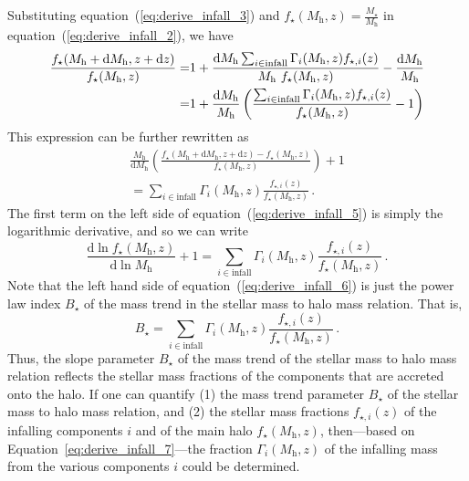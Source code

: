 \documentclass[useAMS,usenatbib,iop,numberedappendix]{mn2e}
\newcommand{\redshift}{\ensuremath{z}}
\newcommand{\dif}{\ensuremath{\mathrm{d}}}
\newcommand{\Mstar}{\ensuremath{M_{\star}}}
\newcommand{\Mhalo}{\ensuremath{M_{\mathrm{h}}}}
\newcommand{\Bstar}{\ensuremath{B_{\star}}}
\newcommand{\fstar}{\ensuremath{f_{\star}}}
\begin{document}
%
Substituting equation~(\ref{eq:derive_infall_3}) and $\fstar(\Mhalo, \redshift) = \frac{\Mstar}{ \Mhalo }$ in equation~(\ref{eq:derive_infall_2}), we have 
%
\begin{eqnarray}
\label{eq:derive_infall_4}
{\fstar(\Mhalo + \dif \Mhalo, \redshift + \dif\redshift) \over \fstar(\Mhalo, \redshift)}
=& 1+
\frac{ \dif\Mhalo \sum_{i \in \mathrm{infall}}\Gamma_{i}(\Mhalo, \redshift)  f_{\mathrm{\star},i}(\redshift) }
{\Mhalo~\fstar(\Mhalo, \redshift)} -\frac{\dif \Mhalo}{\Mhalo}
 \nonumber \\
=&1+\frac{\dif \Mhalo}{\Mhalo}
\left(\frac{ \sum_{i \in \mathrm{infall}} \Gamma_{i}(\Mhalo, \redshift)  f_{\mathrm{\star},i}(\redshift) }{\fstar(\Mhalo, \redshift) } 
-1\right) 
\end{eqnarray}
%
This expression can be further rewritten as
%
\begin{eqnarray}
\label{eq:derive_infall_5}
\frac{\Mhalo}{\dif \Mhalo}
\left(
\frac{
\fstar(\Mhalo + \dif \Mhalo, \redshift + \dif\redshift)  - 
\fstar(\Mhalo, \redshift)
}{
\fstar(\Mhalo, \redshift)
}
\right) + 1\nonumber \\ 
= 
\sum_{i \in \mathrm{infall}} 
\Gamma_{i}(\Mhalo, \redshift)  
\frac{ f_{\mathrm{\star},i}(\redshift) }{  
\fstar(\Mhalo, \redshift) }
\, .
\end{eqnarray}
%
The first term on the left side of equation~(\ref{eq:derive_infall_5}) is simply the logarithmic derivative, and so we can write
%
\begin{equation}
\label{eq:derive_infall_6}
\frac{
\dif \ln \fstar(\Mhalo, \redshift)
}{
\dif \ln \Mhalo
} + 1 = 
\sum_{i \in \mathrm{infall}} 
\Gamma_{i}(\Mhalo, \redshift)  
\frac{ f_{\mathrm{\star},i}(\redshift) }{  
\fstar(\Mhalo, \redshift) }
\, .
\end{equation}
%
Note that the left hand side of equation~(\ref{eq:derive_infall_6}) is just the power law index $\Bstar$ of the mass trend in the stellar mass to halo mass relation.  That is, 
%
\begin{equation}
\label{eq:derive_infall_7}
\Bstar = 
\sum_{i \in \mathrm{infall}} 
\Gamma_{i}(\Mhalo, \redshift)  
\frac{ f_{\mathrm{\star},i}(\redshift) }{  
\fstar(\Mhalo, \redshift) }
\, .
\end{equation}
%
Thus, the slope parameter $\Bstar$ of the mass trend of the stellar mass to halo mass relation reflects the stellar mass fractions of the components that are accreted onto the halo.
If one can quantify 
(1) the mass trend parameter $\Bstar$ of the stellar mass to halo mass relation, and 
(2) the stellar mass fractions $f_{\mathrm{\star},i}(\redshift)$ of the infalling components $i$ and of the main halo $\fstar(\Mhalo, \redshift)$,
then---based on Equation~\ref{eq:derive_infall_7}---the fraction $\Gamma_{i}(\Mhalo, \redshift)$ of the infalling mass from the various components $i$ could be determined.
\end{document}
